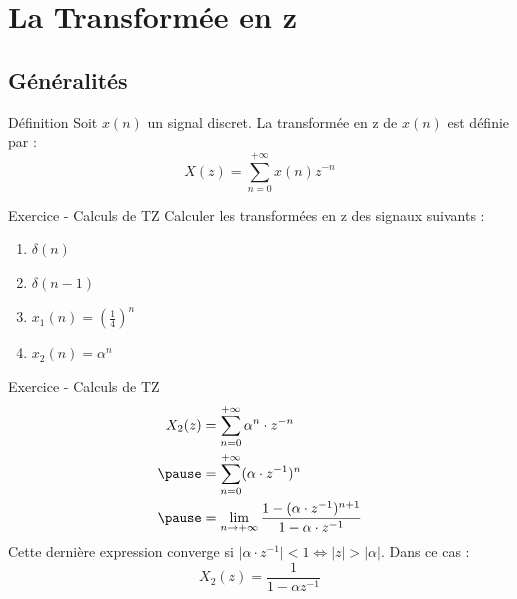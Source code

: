 \documentclass[a4paper,11pt]{beamer}
\newcounter{exampleBlockCounter}
\begin{document}
\section[La TZ]{La Transformée en z} 
\subsection{Généralités}    

\begin{frame}
\begin{block}{Définition}
Soit $x(n)$ un signal discret. La transformée en z de $x(n)$ est définie par :
$$
X(z) = \sum_{n=0}^{+\infty}x(n)z^{-n}
$$
\end{block}
\pause
\begin{exampleblock}{Exercice  - Calculs de TZ}
Calculer les transformées en z des signaux suivants :
\begin{enumerate}
  \item $\delta (n)$
  \item $\delta (n-1)$
  \item $x_1(n) = (\frac{1}{4})^n$
  \item $x_2(n)=\alpha^n$
\end{enumerate}
\end{exampleblock}
\end{frame}

\begin{frame}
\begin{exampleblock}{Exercice  - Calculs de TZ}
$$
\begin{aligned}
X_2(z) &= \sum_{n=0}^{+\infty}\alpha^n \cdot z^{-n}\\
\pause
&= \sum_{n=0}^{+\infty}(\alpha \cdot z^{-1})^{n}\\
\pause
&= \lim_{n \rightarrow +\infty} \frac{1-(\alpha \cdot z^{-1})^{n+1}}{1-\alpha
\cdot z^{-1}}\\
\end{aligned}
$$
\pause
\justifying
Cette dernière expression converge si $\lvert \alpha \cdot z^{-1} \rvert<1
\Leftrightarrow \lvert z \rvert > \lvert \alpha \rvert$. Dans ce cas :
$$
X_2(z) = \frac{1}{1-\alpha z^{-1}}
$$
\end{exampleblock}
\end{frame}
\end{document}
